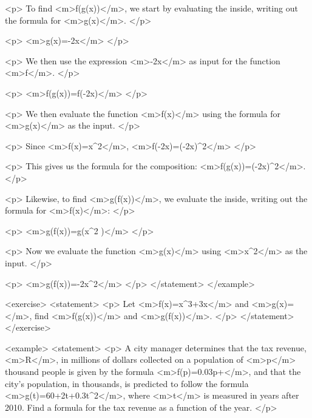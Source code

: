                 <p>
                    To find <m>f(g(x))</m>, we start by evaluating the inside, writing out the formula for <m>g(x)</m>.
                </p>

                <p>
                    <m>g(x)=-2x</m>
                </p>

                <p>
                    We then use the expression <m>-2x</m> as input for the function <m>f</m>.
                </p>

                <p>
                    <m>f(g(x))=f(-2x)</m>
                </p>

                <p>
                    We then evaluate the function <m>f(x)</m> using the formula for <m>g(x)</m> as the input.
                </p>

                <p>
                    Since <m>f(x)=x^{2}</m>, <m>f(-2x)=(-2x)^{2}</m>
                </p>

                <p>
                    This gives us the formula for the composition: <m>f(g(x))=(-2x)^{2}</m>.
                </p>

                <p>
                    Likewise, to find <m>g(f(x))</m>, we evaluate the inside, writing out the formula for <m>f(x)</m>:
                </p>

                <p>
                    <m>g(f(x))=g(x^{2} )</m>
                </p>

                <p>
                    Now we evaluate the function <m>g(x)</m> using <m>x^{2}</m> as the input.
                </p>

                <p>
                    <m>g(f(x))=-2x^{2}</m>
                </p>
            </statement>
        </example>

        <exercise>
            <statement>
                <p>
                    Let <m>f(x)=x^{3}+3x</m> and <m>g(x)=</m>, find <m>f(g(x))</m> and <m>g(f(x))</m>.
                </p>
            </statement>
        </exercise>

        <example>
            <statement>
                <p>
                    A city manager determines that the tax revenue, <m>R</m>, in millions of dollars collected on a population of <m>p</m> thousand people is given by the formula <m>f(p)=0.03p+</m>, and that the city’s population, in thousands, is predicted to follow the formula <m>g(t)=60+2t+0.3t^{2}</m>, where <m>t</m> is measured in years after 2010.
                    Find a formula for the tax revenue as a function of the year.
                </p>

